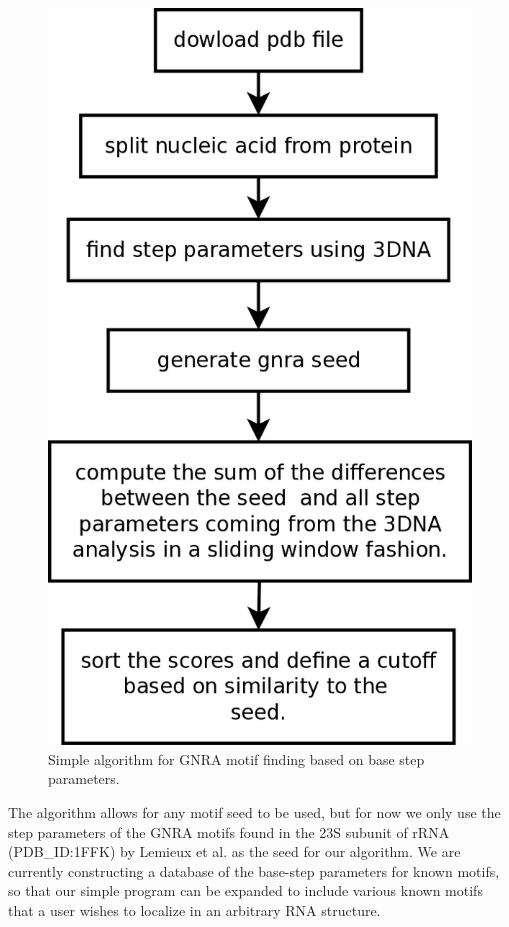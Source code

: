 \begin{figure}
\centering
\includegraphics[angle=0, scale=0.4]{Chapter5/getMotif.png}
\caption{Simple algorithm  for GNRA motif  finding based on  base step
  parameters.}
\label{fig:getMotif}
\end{figure}
  
The algorithm  allows for any  motif seed to  be used, but for  now we
only  use the  step parameters  of the  GNRA motifs  found in  the 23S
subunit of rRNA (PDB\_ID:1FFK) by Lemieux et al. \cite{lemieux2006} as
the seed for our algorithm.   We are currently constructing a database
of  the base-step  parameters for  known  motifs, so  that our  simple
program can  be expanded to include  various known motifs  that a user
wishes to localize in an arbitrary RNA structure.

